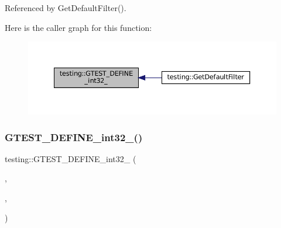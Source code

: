 Referenced by Get\+Default\+Filter().

Here is the caller graph for this function\+:
\nopagebreak
\begin{figure}[H]
\begin{center}
\leavevmode
\includegraphics[width=350pt]{namespacetesting_a9900d8db2670a26999fbc2a9130f7185_icgraph}
\end{center}
\end{figure}
\mbox{\label{namespacetesting_aae6f1140f03d7bf24067df0f6628e9ea}} 
\subsubsection{\texorpdfstring{G\+T\+E\+S\+T\+\_\+\+D\+E\+F\+I\+N\+E\+\_\+int32\+\_\+()}{GTEST\_DEFINE\_int32\_()}\hspace{0.1cm}{\footnotesize\ttfamily [2/3]}}
{\footnotesize\ttfamily testing\+::\+G\+T\+E\+S\+T\+\_\+\+D\+E\+F\+I\+N\+E\+\_\+int32\+\_\+ (\begin{DoxyParamCaption}\item[{repeat}]{,  }\item[{\hyperlink{namespacetesting_1_1internal_a0f7e728793f9e6cb0aa2b69eaa468bf3}{internal\+::\+Int32\+From\+G\+Test\+Env}(\char`\"{}repeat\char`\"{}, 1)}]{,  }\item[{\char`\"{}How many times to repeat each test. Specify a negative number \char`\"{} \char`\"{}for repeating forever. Useful for shaking out flaky tests.\char`\"{}}]{ }\end{DoxyParamCaption})}

\mbox{\label{namespacetesting_a84af642630c9181f00fcf0a4a63e795e}} 
